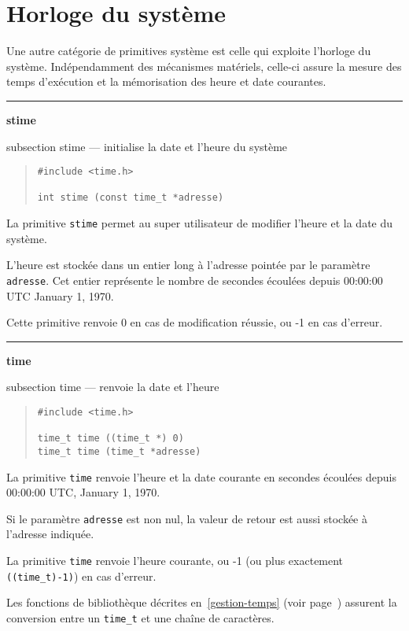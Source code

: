 \documentclass [twoside] {report}
\newcommand {\primitive} [1]
    {
	\phantomsection
	{\large \bf #1}
	\addcontentsline {toc} {subsection} {#1}
    }
\newcommand {\separation}
    {
	\vspace {5mm}
	\nopagebreak
	\hrule
    }
\begin{document}
\section {Horloge du système}


Une autre catégorie de primitives système est
celle qui exploite l'horloge du système.
Indépendamment des mécanismes matériels, celle-ci
assure la mesure des temps d'exé\-cu\-tion et la
mémorisation des heure et date courantes.



\separation
\primitive {stime} --- initialise la date et l'heure du système

\begin {quote}
\begin {verbatim}
#include <time.h>

int stime (const time_t *adresse)
\end{verbatim}
\end {quote}

La primitive {\tt stime} permet au super
utilisateur de modifier l'heure et la date du
système.

L'heure est stockée dans un entier long à
l'adresse pointée par le paramètre {\tt adresse}. Cet
entier représente le nombre de secondes écoulées
depuis 00:00:00 UTC January 1, 1970.

Cette primitive renvoie 0 en cas de modification
réussie, ou -1 en cas d'erreur.




\separation
\primitive {time} --- renvoie la date et l'heure
    \label {time}

\begin {quote}
\begin {verbatim}
#include <time.h>

time_t time ((time_t *) 0)
time_t time (time_t *adresse)
\end{verbatim}
\end {quote}

La primitive {\tt time} renvoie l'heure et la date
courante en secondes écoulées depuis
00:00:00 UTC, January 1, 1970.

Si le paramètre {\tt adresse} est non nul, la valeur
de retour est aussi stockée à l'adresse
indiquée.

La primitive \texttt {time} renvoie l'heure courante, ou -1 (ou plus
exactement \verb|((time_t)-1)|) en cas d'erreur.

Les fonctions de bibliothèque décrites en~\ref {gestion-temps} (voir
page~\pageref {gestion-temps}) assurent la conversion entre un \texttt
{time\_t} et une chaîne de caractères.
\end{document}
